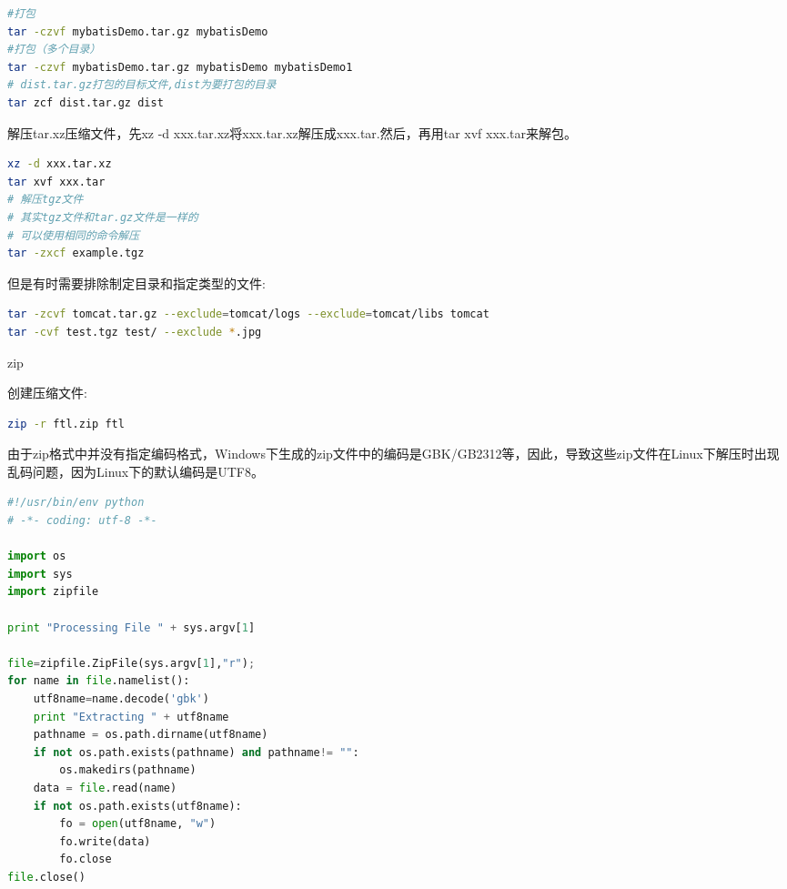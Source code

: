 \documentclass[12pt]{book}
\makeatletter
\numberwithin{dummy}{section}
\theoremstyle{ocrenumbox}
\theoremstyle{blacknumex}
\theoremstyle{blacknumbox}
\theoremstyle{ocrenum}
\renewcommand\paragraph{\@startsection{paragraph}{4}{\z@}
	{-2ex \@plus-.2ex \@minus .2ex}
	{.1ex}
	{\normalfont\small\sffamily\bfseries}}
\makeatother
\begin{document}
\begin{lstlisting}[language=Bash]
#打包
tar -czvf mybatisDemo.tar.gz mybatisDemo
#打包（多个目录）
tar -czvf mybatisDemo.tar.gz mybatisDemo mybatisDemo1
# dist.tar.gz打包的目标文件,dist为要打包的目录
tar zcf dist.tar.gz dist
\end{lstlisting}

解压tar.xz压缩文件，先xz -d xxx.tar.xz将xxx.tar.xz解压成xxx.tar.然后，再用tar xvf xxx.tar来解包。

\begin{lstlisting}[language=Bash]
xz -d xxx.tar.xz
tar xvf xxx.tar
# 解压tgz文件
# 其实tgz文件和tar.gz文件是一样的
# 可以使用相同的命令解压	
tar -zxcf example.tgz
\end{lstlisting}

但是有时需要排除制定目录和指定类型的文件:

\begin{lstlisting}[language=Bash]
tar -zcvf tomcat.tar.gz --exclude=tomcat/logs --exclude=tomcat/libs tomcat
tar -cvf test.tgz test/ --exclude *.jpg
\end{lstlisting}


\paragraph{zip}

创建压缩文件:

\begin{lstlisting}[language=Bash]
zip -r ftl.zip ftl
\end{lstlisting}

由于zip格式中并没有指定编码格式，Windows下生成的zip文件中的编码是GBK/GB2312等，因此，导致这些zip文件在Linux下解压时出现乱码问题，因为Linux下的默认编码是UTF8。


\begin{lstlisting}[language=Python]
#!/usr/bin/env python
# -*- coding: utf-8 -*-

import os
import sys
import zipfile

print "Processing File " + sys.argv[1]

file=zipfile.ZipFile(sys.argv[1],"r");
for name in file.namelist():
	utf8name=name.decode('gbk')
	print "Extracting " + utf8name
	pathname = os.path.dirname(utf8name)
	if not os.path.exists(pathname) and pathname!= "":
		os.makedirs(pathname)
	data = file.read(name)
	if not os.path.exists(utf8name):
		fo = open(utf8name, "w")
		fo.write(data)
		fo.close
file.close()
\end{lstlisting}
\end{document}
